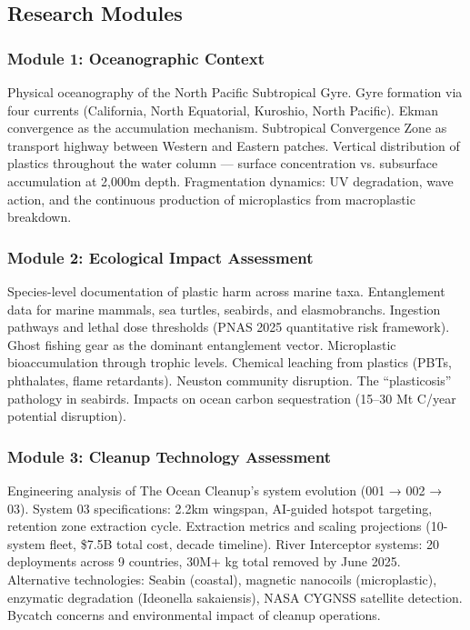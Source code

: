 \documentclass[11pt,letterpaper]{article}
\begin{document}
\subsection{Research Modules}

\subsubsection{Module 1: Oceanographic Context}
Physical oceanography of the North Pacific Subtropical Gyre. Gyre formation via four currents (California, North Equatorial, Kuroshio, North Pacific). Ekman convergence as the accumulation mechanism. Subtropical Convergence Zone as transport highway between Western and Eastern patches. Vertical distribution of plastics throughout the water column --- surface concentration vs. subsurface accumulation at 2,000m depth. Fragmentation dynamics: UV degradation, wave action, and the continuous production of microplastics from macroplastic breakdown.

\subsubsection{Module 2: Ecological Impact Assessment}
Species-level documentation of plastic harm across marine taxa. Entanglement data for marine mammals, sea turtles, seabirds, and elasmobranchs. Ingestion pathways and lethal dose thresholds (PNAS 2025 quantitative risk framework). Ghost fishing gear as the dominant entanglement vector. Microplastic bioaccumulation through trophic levels. Chemical leaching from plastics (PBTs, phthalates, flame retardants). Neuston community disruption. The ``plasticosis'' pathology in seabirds. Impacts on ocean carbon sequestration (15--30 Mt C/year potential disruption).

\subsubsection{Module 3: Cleanup Technology Assessment}
Engineering analysis of The Ocean Cleanup's system evolution (001 → 002 → 03). System 03 specifications: 2.2km wingspan, AI-guided hotspot targeting, retention zone extraction cycle. Extraction metrics and scaling projections (10-system fleet, \$7.5B total cost, decade timeline). River Interceptor systems: 20 deployments across 9 countries, 30M+ kg total removed by June 2025. Alternative technologies: Seabin (coastal), magnetic nanocoils (microplastic), enzymatic degradation (Ideonella sakaiensis), NASA CYGNSS satellite detection. Bycatch concerns and environmental impact of cleanup operations.
\end{document}

